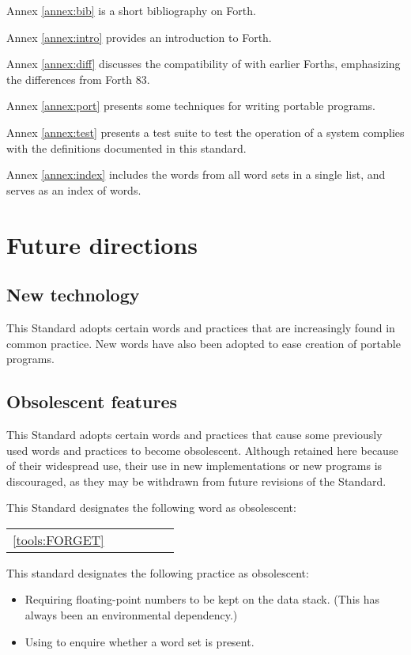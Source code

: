 Annex \ref{annex:bib} is a short bibliography on Forth.

Annex \ref{annex:intro} provides an introduction to Forth.

Annex \ref{annex:diff} discusses the compatibility of 
with earlier Forths, emphasizing the differences from Forth 83.

Annex \ref{annex:port} presents some techniques for writing portable
programs.

Annex \ref{annex:test} presents a test suite to test the operation
of a system complies with the definitions documented in this
standard.

Annex \ref{annex:index} includes the words from all word sets in a
single list, and serves as an index of  words.

\section{Future directions}

\subsection{New technology}

This Standard adopts certain words and practices that are
increasingly found in common practice. New words have also
been adopted to ease creation of portable programs.

\subsection{Obsolescent features}
\label{intro:obsoleat}

This Standard adopts certain words and practices that cause
some previously used words and practices to become obsolescent.
Although retained here because of their widespread use, their
use in new implementations or new programs is discouraged,
as they may be withdrawn from future revisions of the Standard.

This Standard designates the following word as obsolescent:

\begin{tabular}{rl@{\qquad}rl@{\qquad}rl}
	\ref{tools:FORGET}	& \word[tools]{FORGET}	\\
\end{tabular}

This standard designates the following practice as obsolescent:

\begin{itemize}
\item Requiring floating-point numbers to be kept on the data stack.
	(This has always been an environmental dependency.)

\item Using  to enquire whether a word set is present.
\end{itemize}

